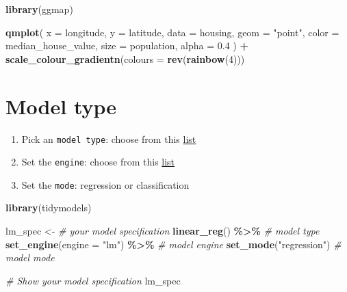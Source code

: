 \documentclass[
]{book}
\newenvironment{Shaded}{\begin{snugshade}}{\end{snugshade}}
\newcommand{\CommentTok}[1]{\textcolor[rgb]{0.56,0.35,0.01}{\textit{#1}}}
\newcommand{\DataTypeTok}[1]{\textcolor[rgb]{0.13,0.29,0.53}{#1}}
\newcommand{\DecValTok}[1]{\textcolor[rgb]{0.00,0.00,0.81}{#1}}
\newcommand{\FloatTok}[1]{\textcolor[rgb]{0.00,0.00,0.81}{#1}}
\newcommand{\KeywordTok}[1]{\textcolor[rgb]{0.13,0.29,0.53}{\textbf{#1}}}
\newcommand{\NormalTok}[1]{#1}
\newcommand{\OperatorTok}[1]{\textcolor[rgb]{0.81,0.36,0.00}{\textbf{#1}}}
\newcommand{\StringTok}[1]{\textcolor[rgb]{0.31,0.60,0.02}{#1}}
\providecommand{\tightlist}{%
  \setlength{\itemsep}{0pt}\setlength{\parskip}{0pt}}
\begin{document}
\begin{Shaded}
\begin{Highlighting}[]
\KeywordTok{library}\NormalTok{(ggmap)}

\KeywordTok{qmplot}\NormalTok{(}
  \DataTypeTok{x =}\NormalTok{ longitude,}
  \DataTypeTok{y =}\NormalTok{ latitude,}
  \DataTypeTok{data =}\NormalTok{ housing,}
  \DataTypeTok{geom =} \StringTok{"point"}\NormalTok{,}
  \DataTypeTok{color =}\NormalTok{ median\_house\_value,}
  \DataTypeTok{size =}\NormalTok{ population,}
  \DataTypeTok{alpha =} \FloatTok{0.4}
\NormalTok{) }\OperatorTok{+}
\StringTok{  }\KeywordTok{scale\_colour\_gradientn}\NormalTok{(}\DataTypeTok{colours =} \KeywordTok{rev}\NormalTok{(}\KeywordTok{rainbow}\NormalTok{(}\DecValTok{4}\NormalTok{)))}
\end{Highlighting}
\end{Shaded}

\hypertarget{model-type}{%
\section{Model type}\label{model-type}}

\begin{enumerate}
\def\labelenumi{\arabic{enumi}.}
\tightlist
\item
  Pick an \texttt{model\ type}: choose from this \href{https://www.tidymodels.org/find/parsnip/}{list}
\item
  Set the \texttt{engine}: choose from this \href{https://www.tidymodels.org/find/parsnip/}{list}
\item
  Set the \texttt{mode}: regression or classification
\end{enumerate}

\begin{Shaded}
\begin{Highlighting}[]
\KeywordTok{library}\NormalTok{(tidymodels)}

\NormalTok{lm\_spec \textless{}{-}}\StringTok{ }\CommentTok{\# your model specification}
\StringTok{  }\KeywordTok{linear\_reg}\NormalTok{() }\OperatorTok{\%\textgreater{}\%}\StringTok{ }\CommentTok{\# model type}
\StringTok{  }\KeywordTok{set\_engine}\NormalTok{(}\DataTypeTok{engine =} \StringTok{"lm"}\NormalTok{) }\OperatorTok{\%\textgreater{}\%}\StringTok{ }\CommentTok{\# model engine}
\StringTok{  }\KeywordTok{set\_mode}\NormalTok{(}\StringTok{"regression"}\NormalTok{) }\CommentTok{\# model mode}

\CommentTok{\# Show your model specification}
\NormalTok{lm\_spec}
\end{Highlighting}
\end{Shaded}
\end{document}
